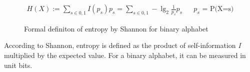 \begin{figure}[H]
	\begin{align*}
	\displaystyle H(X) := \sum_{s \in {0,1}} I(p_s) p_s = \sum_{s \in {0,1}} -\lg_2 \frac{1}{p_s} p_s && \text{$p_s$ = P(X=s)}
	\end{align*}
	\caption{Formal definiton of entropy by Shannon for binary alphabet}
	\label{fig:form-entropy-shan}
\end{figure}
According to Shannon, entropy is defined as the product of self-information \textit{I} multiplied by the expected value. For a binary alphabet, it can be measured in unit bits. 
